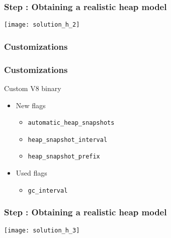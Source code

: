 \begin{frame}
	\frametitle{Step \theStepCounter: Obtaining a realistic heap model}		
	\texttt{[image: solution\_h\_2]}
\end{frame}

\subsubsection{Customizations}
\begin{frame}
	\frametitle{Customizations}
			
			Custom V8 binary
			\begin{itemize}
				\item New flags
				\begin{itemize}
					\item \texttt{automatic\_heap\_snapshots} 		%
					\item \texttt{heap\_snapshot\_interval} 		%
					\item \texttt{heap\_snapshot\_prefix} 			%
				\end{itemize}
				\item Used flags
				\begin{itemize}
					\item \texttt{gc\_interval} 					%
				\end{itemize}
			\end{itemize}
\end{frame}
	
\begin{frame}
	\frametitle{Step \theStepCounter: Obtaining a realistic heap model}		
	\texttt{[image: solution\_h\_3]}
\end{frame}
	
